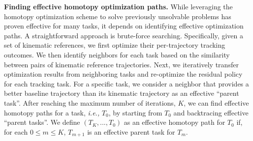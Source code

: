 \noindent\textbf{Finding effective homotopy optimization paths.}
While leveraging the homotopy optimization scheme to solve previously unsolvable problems has proven effective for many tasks, it depends on identifying effective optimization paths. A straightforward approach is brute-force searching. Specifically, given a set of kinematic references, we first optimize their per-trajectory tracking outcomes. We then identify neighbors for each task based on the similarity between pairs of kinematic reference trajectories. Next, we iteratively transfer optimization results from neighboring tasks and re-optimize the residual policy for each tracking task. For a specific task, we consider a neighbor that provides a better baseline trajectory than its kinematic trajectory as an effective ``parent task''.
After reaching the maximum number of iterations, $K$, we can find effective homotopy paths for a task, \emph{i.e.,} $T_0$, by starting from $T_0$ and backtracing
effective ``parent tasks''. We define $(T_{K}, ..., T_0)$ as an effective homotopy path for $T_0$ if, for each $0 \leq m \leq K$, $T_{m+1}$ is 
an effective parent task for $T_m$.


